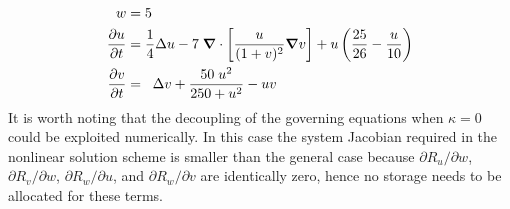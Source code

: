 \begin{align}
  \label{eq:pde_bio_w_concentric_rings_2}
  w &= 5 \\
  \label{eq:pde_bio_u_concentric_rings_2}
  \frac{\partial u}{\partial t} & = \frac{1}{4} \Delta u - 7 \; {\boldsymbol{\nabla}} {}\cdot \left[ \frac{u}{(1+ v)^2} {\boldsymbol{\nabla}} {v} \right]
                                    + u \left( \frac{25}{26} - \frac{u}{10} \right) \\
  \label{eq:pde_bio_v_concentric_rings_2}
  \frac{\partial v}{\partial t} & = \;\;\Delta v + \frac{50 \; u^2}{250 + u^2} - uv
\end{align}
It is worth noting that the decoupling of the governing equations when $\kappa=0$ could be exploited numerically.  In this case the system Jacobian required in the nonlinear solution scheme is smaller than the general case because $\partial R_u/\partial w$, $\partial R_v/\partial w$, $\partial R_w/\partial u$, and $\partial R_w/\partial v$ are identically zero, hence no storage needs to be allocated for these terms.

